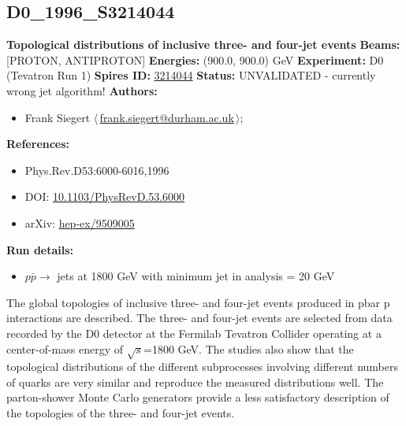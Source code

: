 \subsection[D0\_1996\_S3214044]{D0\_1996\_S3214044\,\cite{Abachi:1995zv}}
\textbf{Topological distributions of inclusive three- and four-jet events}\newline
\textbf{Beams:} [PROTON, ANTIPROTON] \newline
\textbf{Energies:} (900.0, 900.0) GeV \newline
\textbf{Experiment:} D0 (Tevatron Run 1) \newline
\textbf{Spires ID:} \href{http://www.slac.stanford.edu/spires/find/hep/www?rawcmd=key+3214044}{3214044}\newline
\textbf{Status:} UNVALIDATED - currently wrong jet algorithm!\newline
\textbf{Authors:}
\begin{itemize}
  \item Frank Siegert $\langle\,$\href{mailto:frank.siegert@durham.ac.uk}{frank.siegert@durham.ac.uk}$\,\rangle$;
\end{itemize}
\textbf{References:}
\begin{itemize}
  \item Phys.Rev.D53:6000-6016,1996
  \item DOI: \href{http://dx.doi.org/10.1103/PhysRevD.53.6000}{10.1103/PhysRevD.53.6000}
  \item arXiv: \href{http://arxiv.org/abs/hep-ex/9509005}{hep-ex/9509005}
\end{itemize}
\textbf{Run details:}
\begin{itemize}

  \item $p \bar{p} \to$ jets at 1800 GeV with minimum jet \pT in analysis = 20 GeV\end{itemize}

\noindent The global topologies of inclusive three- and four-jet events produced in pbar p interactions are described. The three- and four-jet events are selected from data recorded by the D0 detector at the Fermilab Tevatron Collider operating at a center-of-mass energy of $\sqrt{s}$=1800 GeV. The studies also show that the topological distributions of the different subprocesses involving different numbers of quarks are very similar and reproduce the measured distributions well. The parton-shower Monte Carlo generators provide a less satisfactory description of the topologies of the three- and four-jet events.

